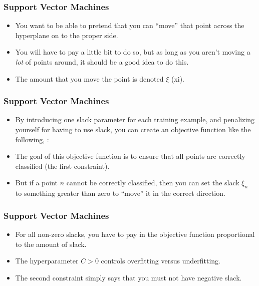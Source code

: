 \documentclass[trans]{beamer}
\begin{document}
\begin{frame}
  \frametitle{Support Vector Machines}
\begin{itemize}
\item   You want to be able to pretend that you
can ``move'' that point across the hyperplane on to the proper side.
\item 
You will have to pay a little bit to do so, but as long as you aren't
moving a \emph{lot} of points around, it should be a good idea to do
this.  
\item The amount that you move the point is denoted
$\xi$ (xi).
\end{itemize}
\end{frame}
\begin{frame}
  \frametitle{Support Vector Machines}
\begin{itemize}
\item 
By introducing one slack parameter for each training example, and
penalizing yourself for having to use slack, you can create an
objective function like the following, :
%
%
\item The goal of this objective function is to ensure that all points are
correctly classified (the first constraint).
\item  But if a point $n$
cannot be correctly classified, then you can set the slack $\xi_n$ to
something greater than zero to ``move'' it in the correct direction.
\end{itemize}
\end{frame}
\begin{frame}
  \frametitle{Support Vector Machines}
\begin{itemize}
\item 
For all non-zero slacks, you have to pay in the objective
function proportional to the amount of slack. 
\item  The hyperparameter
$C>0$ controls overfitting versus underfitting.  
\item The second constraint
simply says that you must not have negative slack.
\end{itemize}
\end{frame}
\end{document}
